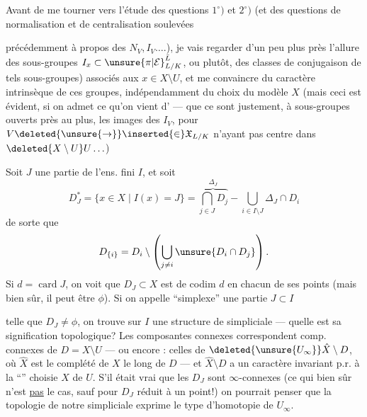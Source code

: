Avant de me tourner vers l'étude des questions $1^\circ)$ et $2^\circ)$ (et  des questions de normalisation et de centralisation soulevées


précédemment à propos des $N_V,I_V\ldots.$), je vais regarder d'un peu plus près l'allure des sous-groupes $I_x\subset\unsure{\pi|\mathcal E}_{L/K}^{\bar L}$, ou  plutôt, des classes de \inserted{$\pi$-}conjugaison de tels sous-groupes) associés aux $x\in X\setminus U$,  et me convaincre du caractère intrinsèque de ces groupes, indépendamment du choix du modèle $X$ (mais ceci est évident, si on admet ce qu'on vient d' --- que ce sont justement, à sous-groupes ouverts près  au plus, les images des $I_V$, pour $V\deleted{\unsure{\to}}\inserted{\in}\mathfrak X_{L/K}$ n'ayant pas  centre dans $\deleted{X\setminus U}U\ldots$)


Soit $J$ une partie de l'ens. fini $I$, et soit
\[
D_J^*=\{x\in X\mid I(x)=J\}
=\overbrace{\bigcap_{j\in J}D_j}^{\Delta_J}-\bigcup_{i\in I\setminus J}\Delta_J\cap D_i
\]
de sorte que
\[
D_{\{i\}}=D_i\setminus\left(\bigcup_{j\ne i}\unsure{D_i\cap D_j}\right).
\]
Si $d=\operatorname{card}J$, on voit que $D_J\subset X$ est  de codim $d$ en chacun de ses points (mais bien sûr, il peut être $\phi$). Si on appelle ``simplexe'' une partie $J\subset I$




telle que $D_J\ne\phi$,  on trouve sur $I$ une structure de   simpliciale --- quelle est sa signification topologique? Les composantes connexes correspondent comp. connexes de $D=X\setminus U$ --- ou encore : celles de $\deleted{\unsure{U_\infty}}\hat X\setminus D$, où $\hat X$ est le  complété de $X$ le long de $D$ --- et $\hat X\setminus D$ a un caractère invariant p.r. à la ``'' choisie $X$ de $U$. S'il était vrai que les $D_J$  sont $\infty$-connexes (ce qui bien sûr n'est \uline{pas} le cas, sauf pour $D_J$ réduit à un point!) on pourrait penser que la topologie de notre   simpliciale exprime le type d'homotopie de $U_\infty$.

